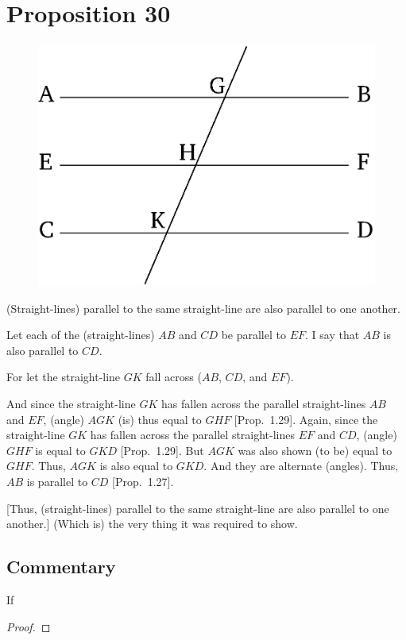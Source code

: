 \chapter*{Proposition 30}



\begin{figure}[ht]
    \begin{center}
    \includegraphics[width=0.5\linewidth]{figures/fig30e.eps}
    \label{fig:prop_30}
    \end{center}
\end{figure}

(Straight-lines) parallel to the same straight-line are also parallel
to one another.

Let each of the (straight-lines) $AB$ and $CD$ be parallel to $EF$. I say that
$AB$ is also parallel to $CD$.

For let the straight-line $GK$ fall across  ($AB$, $CD$, and $EF$).

And since the straight-line $GK$ has fallen across the parallel straight-lines $AB$ and $EF$, (angle) $AGK$
(is) thus equal to $GHF$ [Prop.~1.29]. Again, since the straight-line $GK$ has fallen across the parallel
straight-lines $EF$ and $CD$, (angle) $GHF$ is equal to $GKD$ [Prop.~1.29].
But $AGK$ was also shown (to be) equal to $GHF$. Thus, $AGK$ is also equal to 
$GKD$. And they are alternate (angles). Thus, $AB$ is parallel to $CD$ [Prop.~1.27].

\mbox{[}Thus, (straight-lines) parallel to the same straight-line are also parallel
to one another.] (Which is) the very thing it was required to show.


\section*{Commentary}

\begin{proposition}\label{proposition_30}\leanok
    If
\end{proposition}
\begin{proof}
    \leanok
\end{proof}
